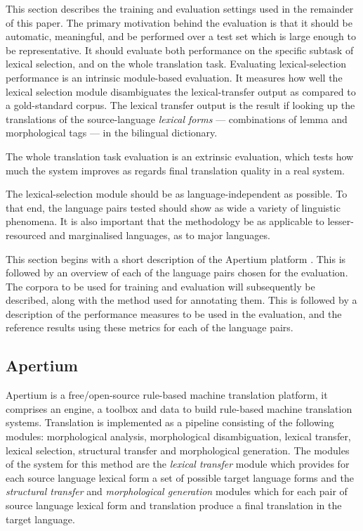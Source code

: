 \documentclass[11pt]{article}
\begin{document}
This section describes the training and evaluation settings used in
the remainder of this paper. The primary motivation behind the
evaluation is that it should be automatic, meaningful, and be performed over a test set which
is large enough to be representative. It should evaluate both
performance on the specific subtask of lexical selection, and on the
whole translation task. Evaluating lexical-selection performance is an
intrinsic module-based evaluation.  It measures how well the lexical
selection module disambiguates the lexical-transfer
output as compared to a gold-standard corpus. The lexical 
transfer output is the result if looking up the translations of the 
source-language \emph{lexical forms} --- combinations of lemma and morphological
tags --- in the bilingual dictionary.

The
whole translation task evaluation is an extrinsic evaluation, which
tests how much the system improves as regards final translation
quality in a real system.

The lexical-selection module should be as language-independent as
possible. To that end, the language pairs tested should show as wide a
variety of linguistic phenomena. It is also important that the
methodology be as applicable to lesser-resourced and marginalised
languages, as to major languages.

This section begins with a short description of the Apertium 
platform \citep{forcada2011apertium}. This is followed by 
an overview of each of the language
pairs chosen for the evaluation. The corpora to be used for training
and evaluation will subsequently be described, along with the method
used for annotating them. This is followed by a description of the
performance measures to be used in the evaluation, and the reference
results using these metrics for each of the language pairs.

\subsection{Apertium}
\label{sec:apertium}

Apertium is a free/open-source rule-based machine translation platform, 
it comprises an engine, a toolbox and data to build rule-based machine
translation systems. Translation is implemented as a pipeline consisting
of the following modules: morphological analysis, morphological disambiguation,
lexical transfer, lexical selection, structural transfer and morphological
generation. The modules of the system for this method are the \emph{lexical transfer}
module which provides for each source language lexical form a set of possible
target language forms and the \emph{structural transfer} and \emph{morphological generation}
modules which for each pair of source language lexical form and translation 
produce a final translation in the target language. 
\end{document}
